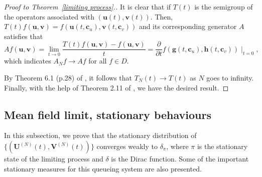 \documentclass[12pt]{article}
\newtheorem{remark}{Remark}[section]
\newcommand{\blue}[1]{\textcolor{blue}{#1}}
\begin{document}
\begin{proof}[\textit{Proof to Theorem~\ref{limiting process}.}]
It is clear that if $T(t)$ is the semigroup of the operators associated with $(\textbf{u}(t),\textbf{v}(t))$. Then,
$T(t)f(\textbf{u},\textbf{v})=f(\textbf{u}(t,\textbf{c}_u),\textbf{v}(t,\textbf{c}_v))$ and its corresponding generator $A$ satisfies that \[Af(\textbf{u},\textbf{v})=\lim\limits_{t\longrightarrow0}\frac{T(t)f(\textbf{u},\textbf{v})-f(\textbf{u},\textbf{v})}{t}=\displaystyle\frac{\partial}{\partial t}f\left(\textbf{g}(t,\textbf{c}_u),\textbf{h}(t,\textbf{c}_v)\right)\mid_{t=0},\]
which indicates $A_N f \longrightarrow A f$ for all $f\in D$.

By Theorem 6.1 (p.28) of \cite{EK}, it follows that $T_N (t)\to T(t)$ as $N$ goes to infinity. Finally, with the help of  Theorem 2.11 of \cite{EK}, we have the desired result.
\end{proof}


\subsection{Mean field limit, stationary behaviours}

In this subsection, we prove that the stationary distribution of $\{(\textbf{U}^{(N)}(t), \textbf{V}^{(N)}(t))\}$ converges weakly to $\delta_{\pi}$, where $\pi$ is the stationary state of the limiting process and $\delta$ is the Dirac function. Some of the important stationary measures for this queueing system are also presented.
\end{document}
